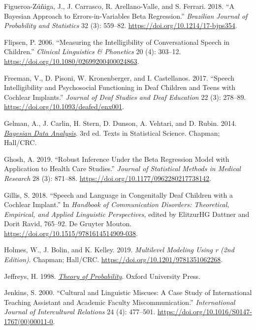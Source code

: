 \documentclass[
sn-apacite
]{sn-jnl}
\newlength{\cslhangindent}
\newenvironment{CSLReferences}[2] %
 {\begin{list}{}{%
  \setlength{\itemindent}{0pt}
  \setlength{\leftmargin}{0pt}
  \setlength{\parsep}{0pt}
  \ifodd #1
   \setlength{\leftmargin}{\cslhangindent}
   \setlength{\itemindent}{-1\cslhangindent}
  \fi
  \setlength{\itemsep}{#2\baselineskip}}}
 {\end{list}}
\begin{document}
\begin{CSLReferences}{1}{0}
Figueroa-Zúñiga, J., J. Carrasco, R. Arellano-Valle, and S. Ferrari.
2018. {``A Bayesian Approach to Errors-in-Variables Beta Regression.''}
\emph{Brazilian Journal of Probability and Statistics} 32 (3): 559--82.
\url{https://doi.org/10.1214/17-bjps354}.

Flipsen, P. 2006. {``Measuring the Intelligibility of Conversational
Speech in Children.''} \emph{Clinical Linguistics \& Phonetics} 20 (4):
303--12. \url{https://doi.org/10.1080/02699200400024863}.

Freeman, V., D. Pisoni, W. Kronenberger, and I. Castellanos. 2017.
{``Speech Intelligibility and Psychosocial Functioning in Deaf Children
and Teens with Cochlear Implants.''} \emph{Journal of Deaf Studies and
Deaf Education} 22 (3): 278--89.
\url{https://doi.org/10.1093/deafed/enx001}.

Gelman, A., J. Carlin, H. Stern, D. Dunson, A. Vehtari, and D. Rubin.
2014. \emph{\href{}{Bayesian Data Analysis}}. 3rd ed. Texts in
Statistical Science. Chapman; Hall/CRC.

Ghosh, A. 2019. {``Robust Inference Under the Beta Regression Model with
Application to Health Care Studies.''} \emph{Journal of Statistical
Methods in Medical Research} 28 (3): 871--88.
\url{https://doi.org/10.1177/0962280217738142}.

Gillis, S. 2018. {``Speech and Language in Congenitally Deaf Children
with a Cochlear Implant.''} In \emph{Handbook of Communication
Disorders: Theoretical, Empirical, and Applied Linguistic Perspectives},
edited by ElitzurHG Dattner and Dorit Ravid, 765--92. De Gruyter Mouton.
\url{https://doi.org/10.1515/9781614514909-038}.

Holmes, W., J. Bolin, and K. Kelley. 2019. \emph{Multilevel Modeling
Using r (2nd Edition)}. Chapman; Hall/CRC.
\url{https://doi.org/10.1201/9781351062268}.

Jeffreys, H. 1998. \emph{\href{}{Theory of Probability}}. Oxford
University Press.

Jenkins, S. 2000. {``Cultural and Linguistic Miscues: A Case Study of
International Teaching Assistant and Academic Faculty
Miscommunication.''} \emph{International Journal of Intercultural
Relations} 24 (4): 477--501.
\url{https://doi.org/10.1016/S0147-1767(00)00011-0}.


\end{CSLReferences}
\end{document}
